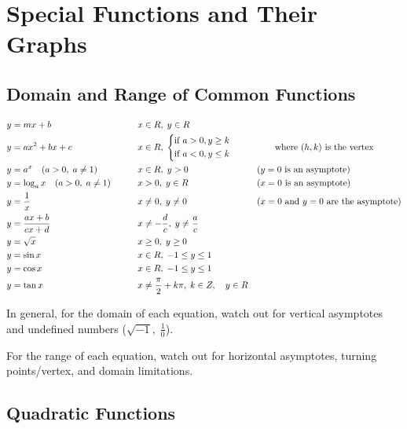 \documentclass[../notes.tex]{subfiles}
\begin{document}
\section{Special Functions and Their Graphs}

\subsection{Domain and Range of Common Functions}

\begin{alignat}{3}
	y &= mx + b \qquad &&x \in R,\; y \in R\\
	y &= ax^2 + bx + c \qquad &&x \in R,\;
	\begin{dcases}
		\textrm{if } a > 0, y \ge k \\
		\textrm{if } a < 0, y \le k
	\end{dcases} && \qquad \textrm{where } (h,k) \textrm{ is the vertex}\\
	y &= a^x \quad (a>0,\; a\neq1) \qquad && x \in R,\; y > 0 \qquad && (y = 0 \textrm{ is an asymptote}) \\
	y &= \log_a{x} \quad (a>0,\;a\neq1) \qquad && x > 0,\; y \in R \qquad && (x=0 \textrm{ is an asymptote}) \\
	y &= \frac{1}{x} \quad && x \neq 0,\; y \neq 0 \qquad && (x=0 \textrm{ and } y=0 \textrm{ are the asymptote}) \\
	y &= \frac{ax+b}{cx+d} \quad && x \neq -\frac{d}{c},\; y\neq \frac{a}{c} \\
	y &= \sqrt{x} \quad && x \ge 0,\; y \ge 0 \\
	y &= \sin{x} \quad && x \in R, \; -1 \le y \le 1 \\
	y &= \cos{x} \quad && x \in R,\; -1 \le y \le 1 \\
	y &= \tan{x} \quad && x \neq \frac{\pi}{2}+k\pi,\;k \in Z,\quad y \in R \\
\end{alignat} 

In general, for the domain of each equation, watch out for vertical asymptotes and undefined numbers ($\sqrt{-1},\; \frac{1}{0}$).

For the range of each equation, watch out for horizontal asymptotes, turning points/vertex, and domain limitations.

\subsection{Quadratic Functions}
\end{document}
